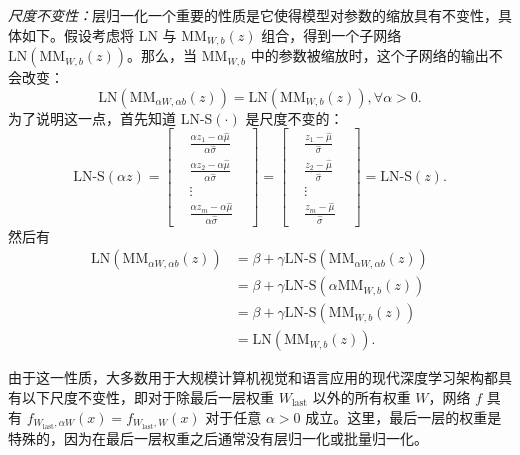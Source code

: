 \vspace{0.5em}
\noindent\textit{尺度不变性：}层归一化一个重要的性质是它使得模型对参数的缩放具有不变性，具体如下。假设考虑将 LN 与 $\text{MM}_{W,b}(z)$ 组合，得到一个子网络 $\text{LN}(\text{MM}_{W,b}(z))$。那么，当 $\text{MM}_{W,b}$ 中的参数被缩放时，这个子网络的输出不会改变：
\begin{equation}
    \text{LN}(\text{MM}_{\alpha W, \alpha b}(z)) = \text{LN}(\text{MM}_{W,b}(z)), \forall \alpha > 0. \label{eq:7.42}
\end{equation}
为了说明这一点，首先知道 LN-S$(\cdot)$ 是尺度不变的：
\begin{equation}
    \text{LN-S}(\alpha z) = \begin{bmatrix}
        &\frac{\alpha z_1 - \alpha \hat{\mu}}{\alpha \hat{\sigma}}& \\
        &\frac{\alpha z_2 - \alpha \hat{\mu}}{\alpha \hat{\sigma}}& \\
        &\vdots& \\
        &\frac{\alpha z_m - \alpha \hat{\mu}}{\alpha \hat{\sigma}}&
    \end{bmatrix} = \begin{bmatrix}
        &\frac{z_1 - \hat{\mu}}{\hat{\sigma}}& \\
        &\frac{z_2 - \hat{\mu}}{\hat{\sigma}}& \\
        &\vdots& \\
        &\frac{z_m - \hat{\mu}}{\hat{\sigma}}&
    \end{bmatrix} = \text{LN-S}(z). \label{eq:7.43}
\end{equation}
然后有
\begin{align}
    \text{LN}(\text{MM}_{\alpha W, \alpha b}(z)) &= \beta + \gamma \text{LN-S}(\text{MM}_{\alpha W, \alpha b}(z)) \label{eq:7.44} \\
    &= \beta + \gamma \text{LN-S}(\alpha \text{MM}_{W,b}(z)) \label{eq:7.45} \\
    &= \beta + \gamma \text{LN-S}(\text{MM}_{W,b}(z)) \label{eq:7.46} \\
    &= \text{LN}(\text{MM}_{W,b}(z)). \label{eq:7.47}
\end{align}

由于这一性质，大多数用于大规模计算机视觉和语言应用的现代深度学习架构都具有以下尺度不变性，即对于除最后一层权重 $W_{\text{last}}$ 以外的所有权重 $W$，网络 $f$ 具有 $f_{W_{\text{last}}, \alpha W}(x) = f_{W_{\text{last}}, W}(x)$ 对于任意 $\alpha > 0$ 成立。这里，最后一层的权重是特殊的，因为在最后一层权重之后通常没有层归一化或批量归一化。

